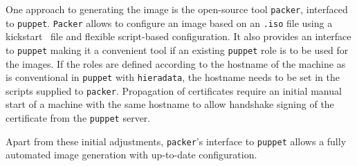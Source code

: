 
One approach to generating the image is the open-source tool
\texttt{packer}\cite{packer}, interfaced to \texttt{puppet}\cite{puppet}.
\texttt{Packer} allows to configure an image based on an \texttt{.iso} file using a kickstart~\cite{kickstart} file and flexible script-based configuration. 
It also provides an interface to \texttt{puppet} making it a convenient tool if an existing \texttt{puppet} role is to be used for the images. If the roles are defined according to the hostname of the machine as is conventional in \texttt{puppet} with \texttt{hieradata}, the hostname needs to be set in the scripts supplied to \texttt{packer}. Propagation of certificates require an initial manual start of a machine with the same hostname to allow handshake signing of the certificate from the \texttt{puppet} server.

Apart from these initial adjustments, \texttt{packer}'s interface to \texttt{puppet} allows a fully automated image generation with up-to-date configuration.
